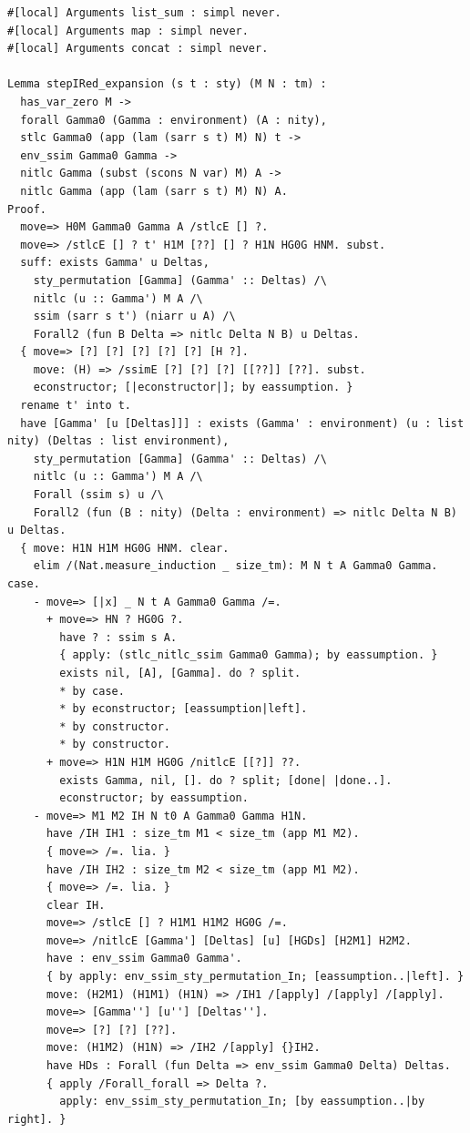 \begin{lstlisting}[style=authorcoq]
#[local] Arguments list_sum : simpl never.
#[local] Arguments map : simpl never.
#[local] Arguments concat : simpl never.

Lemma stepIRed_expansion (s t : sty) (M N : tm) :
  has_var_zero M ->
  forall Gamma0 (Gamma : environment) (A : nity),
  stlc Gamma0 (app (lam (sarr s t) M) N) t ->
  env_ssim Gamma0 Gamma ->
  nitlc Gamma (subst (scons N var) M) A ->
  nitlc Gamma (app (lam (sarr s t) M) N) A.
Proof.
  move=> H0M Gamma0 Gamma A /stlcE [] ?.
  move=> /stlcE [] ? t' H1M [??] [] ? H1N HG0G HNM. subst.
  suff: exists Gamma' u Deltas,
    sty_permutation [Gamma] (Gamma' :: Deltas) /\
    nitlc (u :: Gamma') M A /\
    ssim (sarr s t') (niarr u A) /\
    Forall2 (fun B Delta => nitlc Delta N B) u Deltas.
  { move=> [?] [?] [?] [?] [?] [H ?].
    move: (H) => /ssimE [?] [?] [?] [[??]] [??]. subst.
    econstructor; [|econstructor|]; by eassumption. }
  rename t' into t.
  have [Gamma' [u [Deltas]]] : exists (Gamma' : environment) (u : list nity) (Deltas : list environment),
    sty_permutation [Gamma] (Gamma' :: Deltas) /\
    nitlc (u :: Gamma') M A /\
    Forall (ssim s) u /\
    Forall2 (fun (B : nity) (Delta : environment) => nitlc Delta N B) u Deltas.
  { move: H1N H1M HG0G HNM. clear.
    elim /(Nat.measure_induction _ size_tm): M N t A Gamma0 Gamma. case.
    - move=> [|x] _ N t A Gamma0 Gamma /=.
      + move=> HN ? HG0G ?.
        have ? : ssim s A.
        { apply: (stlc_nitlc_ssim Gamma0 Gamma); by eassumption. }
        exists nil, [A], [Gamma]. do ? split.
        * by case.
        * by econstructor; [eassumption|left].
        * by constructor.
        * by constructor.
      + move=> H1N H1M HG0G /nitlcE [[?]] ??.
        exists Gamma, nil, []. do ? split; [done| |done..].
        econstructor; by eassumption.
    - move=> M1 M2 IH N t0 A Gamma0 Gamma H1N.
      have /IH IH1 : size_tm M1 < size_tm (app M1 M2).
      { move=> /=. lia. }
      have /IH IH2 : size_tm M2 < size_tm (app M1 M2).
      { move=> /=. lia. }
      clear IH.
      move=> /stlcE [] ? H1M1 H1M2 HG0G /=.
      move=> /nitlcE [Gamma'] [Deltas] [u] [HGDs] [H2M1] H2M2.
      have : env_ssim Gamma0 Gamma'.
      { by apply: env_ssim_sty_permutation_In; [eassumption..|left]. }
      move: (H2M1) (H1M1) (H1N) => /IH1 /[apply] /[apply] /[apply].
      move=> [Gamma''] [u''] [Deltas''].
      move=> [?] [?] [??].
      move: (H1M2) (H1N) => /IH2 /[apply] {}IH2.
      have HDs : Forall (fun Delta => env_ssim Gamma0 Delta) Deltas.
      { apply /Forall_forall => Delta ?.
        apply: env_ssim_sty_permutation_In; [by eassumption..|by right]. }

\end{lstlisting}
